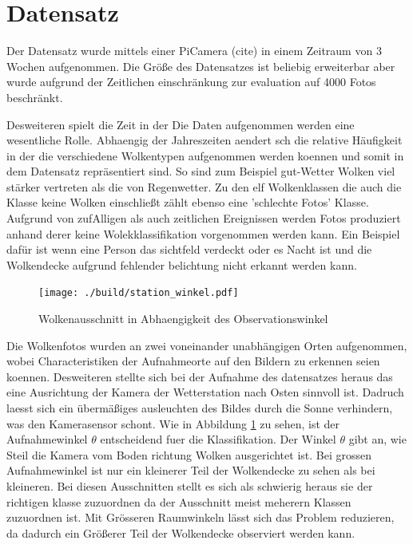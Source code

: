 \section{Datensatz}
\label{sec:02_Datensatz}

Der Datensatz wurde mittels einer PiCamera (cite) in einem Zeitraum von 3 Wochen
aufgenommen. 
Die Größe des Datensatzes ist beliebig erweiterbar aber wurde aufgrund der
Zeitlichen einschränkung zur evaluation auf \num{4000} Fotos beschränkt. 

Desweiteren spielt die Zeit in der Die Daten aufgenommen werden eine wesentliche
Rolle.
Abhaengig der Jahreszeiten aendert sch die relative Häufigkeit in der die verschiedene
Wolkentypen aufgenommen werden koennen und somit in dem Datensatz repräsentiert sind. 
So sind zum Beispiel gut-Wetter Wolken viel stärker vertreten als die von
Regenwetter. 
Zu den elf Wolkenklassen die auch die Klasse keine Wolken einschließt zählt
ebenso eine 'schlechte Fotos' Klasse. 
Aufgrund von zufAlligen als auch zeitlichen Ereignissen werden Fotos produziert
anhand derer keine Wolekklassifikation vorgenommen werden kann.
Ein Beispiel dafür ist wenn eine Person das sichtfeld verdeckt oder es Nacht ist
und die Wolkendecke aufgrund fehlender belichtung nicht erkannt werden kann. 

\begin{figure}
		\centering
		\vspace{-0.5cm}
		\texttt{[image: ./build/station\_winkel.pdf]}
		\caption{Wolkenausschnitt in Abhaengigkeit des Observationswinkel}
		\label{fig:theta}
		\vspace{-0.5cm}
\end{figure}
Die Wolkenfotos wurden an zwei voneinander unabhängigen Orten aufgenommen, wobei
Characteristiken der Aufnahmeorte auf den Bildern zu erkennen seien koennen.
Desweiteren stellte sich bei der Aufnahme des datensatzes heraus das eine
Ausrichtung der Kamera der Wetterstation nach Osten sinnvoll ist.
Dadruch laesst sich ein übermäßiges ausleuchten des Bildes durch die Sonne
verhindern, was den Kamerasensor schont.
Wie in Abbildung \ref{fig:theta} zu sehen, ist der Aufnahmewinkel $\theta$ 
entscheidend fuer die Klassifikation. 
Der Winkel $\theta$ gibt an, wie Steil die Kamera vom Boden richtung Wolken 
ausgerichtet ist.
Bei grossen Aufnahmewinkel ist nur ein kleinerer Teil der Wolkendecke zu sehen
als bei kleineren.
Bei diesen Ausschnitten stellt es sich als schwierig heraus sie der richtigen
klasse zuzuordnen da der Ausschnitt meist meherern Klassen zuzuordnen ist. 
Mit Grösseren Raumwinkeln lässt sich das Problem reduzieren, da dadurch ein
Größerer Teil der Wolkendecke observiert werden kann. 

